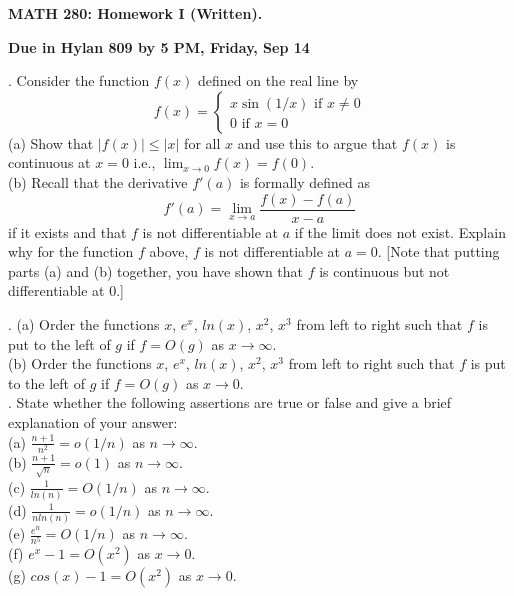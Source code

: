 \documentclass[12 pt]{article}
\newcommand{\sine}{\operatorname{sin}}
\begin{document}
\centerline{\bf MATH 280: Homework I (Written). }
\centerline{\bf Due in Hylan 809 by 5 PM, Friday, Sep 14}

\bigskip

. Consider the function $f(x)$ defined on the real line by
$$
f(x) = \begin{cases}
x \sine(1/x) \text{ if } x \neq 0 \\
0 \text{ if } x = 0
\end{cases}
$$
(a) Show that $|f(x)| \leq |x|$ for all $x$ and use this to argue that 
$f(x)$ is continuous at $x=0$ i.e., $\displaystyle\lim_{x \to 0} f(x) = f(0)$. \\

\noindent
(b) Recall that the derivative $f'(a)$ is formally defined as 
$$
f'(a) = \lim_{x \to a} \frac{f(x)-f(a)}{x-a}
$$
if it exists and that $f$ is not differentiable at $a$ if the limit does not exist. 
Explain why for the function $f$ above, $f$ is not differentiable at $a=0$.
[Note that putting parts (a) and (b) together, you have shown that $f$ is continuous 
but not differentiable at $0$.]

\medskip

. 
(a) Order the functions $x$, $e^x$, $ln(x)$, $x^2$, $x^3$ from left to right such 
that $f$ is put to the left of $g$ if $f=O(g)$ as $x \to \infty$. \\

\noindent
(b) Order the functions $x$, $e^x$, $ln(x)$, $x^2$, $x^3$ from left to right 
such that $f$ is put to the left of $g$ if $f=O(g)$ as $x \to 0$. \\

. State whether the following assertions are true or false and give a brief explanation of your answer: \\
(a) $\frac{n+1}{n^2} = o(1/n)$ as $n \to \infty$. \\
(b) $\frac{n+1}{\sqrt{n}}=o(1)$ as $n \to \infty$. \\
(c) $\frac{1}{ln(n)} = O(1/n)$ as $n \to \infty$. \\
(d) $\frac{1}{n ln(n)} = o(1/n)$ as $n \to \infty$. \\
(e) $\frac{e^n}{n^5} = O(1/n)$ as $n \to \infty$. \\
(f) $e^x-1 = O(x^2)$ as $x \to 0$. \\
(g) $cos(x)-1 = O(x^2)$ as $x \to 0$. \\
\end{document}
